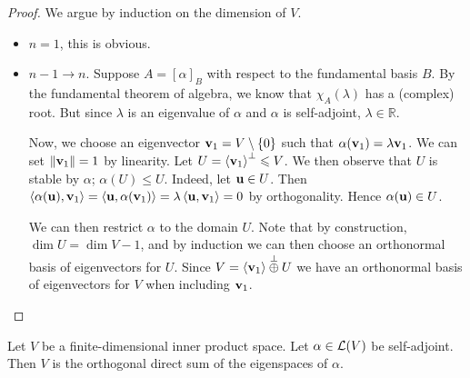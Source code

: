 \documentclass[a4paper,11pt]{article}
\begin{document}
\begin{proof}
	We argue by induction on the dimension of $V$. 
	\begin{itemize}
		\item $n=1$, this is obvious. 
		\item $ n-1\to n $. Suppose \( A = [\alpha]_B \) with respect to the fundamental basis \( B \). By the fundamental theorem of algebra, we know that \( \chi_A(\lambda) \) has a (complex) root.
		But since \( \lambda \) is an eigenvalue of \( \alpha \) and \( \alpha \) is self-adjoint, \( \lambda \in \mathbb R \).

		Now, we choose an eigenvector \( {\bf v}_1 = V \setminus \qty{0} \) such that \( \alpha({\bf v}_1) = \lambda {\bf v}_1 \).
		We can set \( \norm{{\bf v}_1} = 1 \) by linearity.
		Let \( U = \left\langle{} {\bf v}_1 \right\rangle^\perp \leqslant V \).
		We then observe that \( U \) is stable by \( \alpha \); \( \alpha(U) \leq U \).
		Indeed, let \( {\bf u} \in U \).
		Then \( \left\langle{\alpha({\bf u}), {\bf v}_1}\right\rangle = \left\langle{{\bf u}, \alpha({\bf v}_1)}\right\rangle = \lambda \left\langle{{\bf u}, {\bf v}_1}\right\rangle = 0 \) by orthogonality.
		Hence \( \alpha({\bf u}) \in U \).

		We can then restrict \( \alpha \) to the domain \( U \). Note that by construction, $ \dim U = \dim V - 1 $, and by induction we can then choose an orthonormal basis of eigenvectors for \( U \).
		Since \( V = \left\langle{} {\bf v}_1 \right\rangle \overset{\perp}{\oplus} U \) we have an orthonormal basis of eigenvectors for \( V \) when including \( {\bf v}_1 \).\qedhere
	\end{itemize}
\end{proof}
\begin{corollary}
	Let \( V \) be a finite-dimensional inner product space.
	Let \( \alpha \in {\mathcal{L}}(V) \) be self-adjoint.
	Then \( V \) is the orthogonal direct sum of the eigenspaces of \( \alpha \).
\end{corollary}
\end{document}

